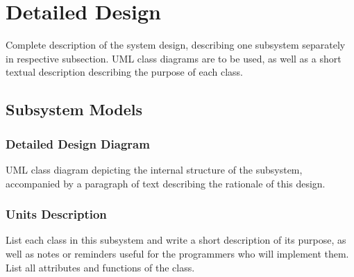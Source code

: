 \section{Detailed Design} \label{sec:detail}

Complete description of the system design, describing one subsystem separately in respective subsection.
UML class diagrams are to be used, as well as a short textual description describing the purpose of each class.

\subsection{Subsystem Models}

\subsubsection{Detailed Design Diagram}

UML class diagram depicting the internal structure of the subsystem,
accompanied by a paragraph of text describing the rationale of this design.

\subsubsection{Units Description}

List each class in this subsystem and write a short description of its purpose,
as well as notes or reminders useful for the programmers who will implement them.
List all attributes and functions of the class.